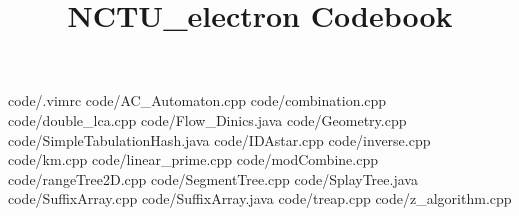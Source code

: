 \documentclass {article}
\begin{document}
\title {NCTU_electron Codebook}
 {code/.vimrc}
 {code/AC_Automaton.cpp}
 {code/combination.cpp}
 {code/double_lca.cpp}
 {code/Flow_Dinics.java}
 {code/Geometry.cpp}
 {code/SimpleTabulationHash.java}
 {code/IDAstar.cpp}
 {code/inverse.cpp}
 {code/km.cpp}
 {code/linear_prime.cpp}
 {code/modCombine.cpp}
 {code/rangeTree2D.cpp}
 {code/SegmentTree.cpp}
 {code/SplayTree.java}
 {code/SuffixArray.cpp}
 {code/SuffixArray.java}
 {code/treap.cpp}
 {code/z_algorithm.cpp}
\end{document}

